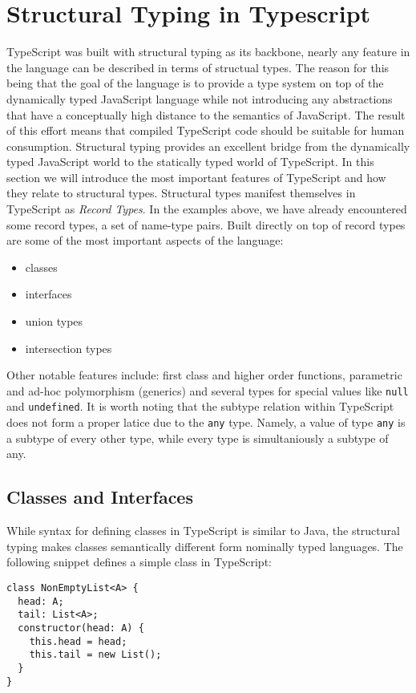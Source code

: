 \section{Structural Typing in Typescript}
\label{sec:structural-typing-typescript}
TypeScript was built with structural typing as its backbone, 
nearly any feature in the language can be described in terms of structual types.
The reason for this being that the goal of the language is to provide a type system
on top of the dynamically typed JavaScript language while not introducing any 
abstractions that have a conceptually high distance to the semantics of JavaScript.
The result of this effort means that compiled TypeScript code should be suitable 
for human consumption. Structural typing provides an excellent bridge from the 
dynamically typed JavaScript world to the statically typed world of TypeScript.
In this section we will introduce the most important features of TypeScript and
how they relate to structural types.
\bigskip
Structural types manifest themselves in TypeScript as \textit{Record Types}.
In the examples above, we have already encountered some record types, a set of name-type pairs.
Built directly on top of record types are some of the most important aspects of the language:
\begin{itemize}
\item classes
\item interfaces
\item union types
\item intersection types
\end{itemize}

Other notable features include: first class and higher order functions, parametric and ad-hoc polymorphism 
(generics) and several types for special values like \texttt{null} and \texttt{undefined}. It is 
worth noting that the subtype relation within TypeScript does not form a proper latice due to 
the \texttt{any} type. Namely, a value of type \texttt{any} is a subtype of every other type, 
while every type is simultaniously a subtype of any.
\bigskip
\subsection{Classes and Interfaces}
While syntax for defining classes in TypeScript is similar to Java, the structural typing makes classes semantically different form nominally typed languages.
The following snippet defines a simple class in TypeScript:

\begin{lstlisting}
class NonEmptyList<A> {
  head: A;
  tail: List<A>;
  constructor(head: A) {
    this.head = head;
    this.tail = new List();
  }
}
\end{lstlisting}

